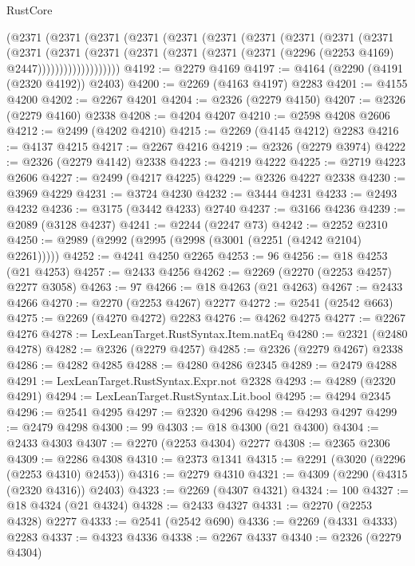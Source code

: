 \begin{lexlean}{RustCore}
\begin{coremodule}
      (@2371
        (@2371
          (@2371
            (@2371
              (@2371
                (@2371
                  (@2371
                    (@2371
                      (@2371
                        (@2371
                          (@2371
                            (@2371
                              (@2371
                                (@2371
                                  (@2371 (@2371 (@2371 (@2296 (@2253 @4169) @2447)))))))))))))))))))
@4192 := @2279 @4169
@4197 := @4164 (@2290 (@4191 (@2320 @4192)) @2403)
@4200 := @2269 (@4163 @4197) @2283
@4201 := @4155 @4200
@4202 := @2267 @4201
@4204 := @2326 (@2279 @4150)
@4207 := @2326 (@2279 @4160) @2338
@4208 := @4204 @4207
@4210 := @2598 @4208 @2606
@4212 := @2499 (@4202 @4210)
@4215 := @2269 (@4145 @4212) @2283
@4216 := @4137 @4215
@4217 := @2267 @4216
@4219 := @2326 (@2279 @3974)
@4222 := @2326 (@2279 @4142) @2338
@4223 := @4219 @4222
@4225 := @2719 @4223 @2606
@4227 := @2499 (@4217 @4225)
@4229 := @2326 @4227 @2338
@4230 := @3969 @4229
@4231 := @3724 @4230
@4232 := @3444 @4231
@4233 := @2493 @4232
@4236 := @3175 (@3442 @4233) @2740
@4237 := @3166 @4236
@4239 := @2089 (@3128 @4237)
@4241 := @2244 (@2247 @73)
@4242 := @2252 @2310
@4250 := @2989 (@2992 (@2995 (@2998 (@3001 (@2251 (@4242 @2104) @2261)))))
@4252 := @4241 @4250 @2265
@4253 := 96
@4256 := @18 @4253 (@21 @4253)
@4257 := @2433 @4256
@4262 := @2269 (@2270 (@2253 @4257) @2277 @3058)
@4263 := 97
@4266 := @18 @4263 (@21 @4263)
@4267 := @2433 @4266
@4270 := @2270 (@2253 @4267) @2277
@4272 := @2541 (@2542 @663)
@4275 := @2269 (@4270 @4272) @2283
@4276 := @4262 @4275
@4277 := @2267 @4276
@4278 := LexLeanTarget.RustSyntax.Item.natEq
@4280 := @2321 (@2480 @4278)
@4282 := @2326 (@2279 @4257)
@4285 := @2326 (@2279 @4267) @2338
@4286 := @4282 @4285
@4288 := @4280 @4286 @2345
@4289 := @2479 @4288
@4291 := LexLeanTarget.RustSyntax.Expr.not @2328
@4293 := @4289 (@2320 @4291)
@4294 := LexLeanTarget.RustSyntax.Lit.bool
@4295 := @4294 @2345
@4296 := @2541 @4295
@4297 := @2320 @4296
@4298 := @4293 @4297
@4299 := @2479 @4298
@4300 := 99
@4303 := @18 @4300 (@21 @4300)
@4304 := @2433 @4303
@4307 := @2270 (@2253 @4304) @2277
@4308 := @2365 @2306
@4309 := @2286 @4308
@4310 := @2373 @1341
@4315 := @2291 (@3020 (@2296 (@2253 @4310) @2453))
@4316 := @2279 @4310
@4321 := @4309 (@2290 (@4315 (@2320 @4316)) @2403)
@4323 := @2269 (@4307 @4321)
@4324 := 100
@4327 := @18 @4324 (@21 @4324)
@4328 := @2433 @4327
@4331 := @2270 (@2253 @4328) @2277
@4333 := @2541 (@2542 @690)
@4336 := @2269 (@4331 @4333) @2283
@4337 := @4323 @4336
@4338 := @2267 @4337
@4340 := @2326 (@2279 @4304)

\end{coremodule}
\end{lexlean}
